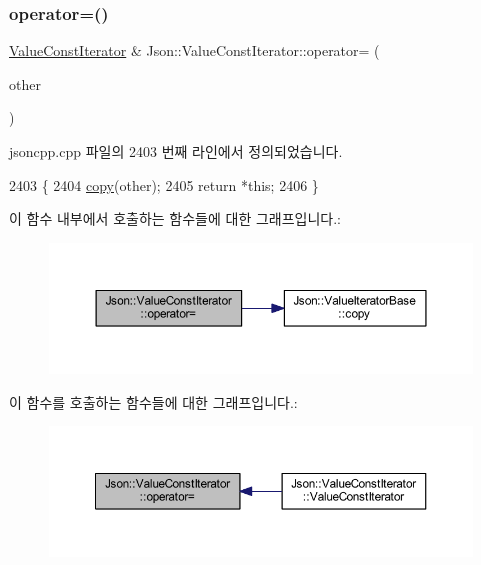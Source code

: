 \subsubsection{\texorpdfstring{operator=()}{operator=()}}
{\footnotesize\ttfamily \hyperlink{class_json_1_1_value_const_iterator}{Value\+Const\+Iterator} \& Json\+::\+Value\+Const\+Iterator\+::operator= (\begin{DoxyParamCaption}\item[{const \hyperlink{class_json_1_1_value_iterator_base}{Value\+Iterator\+Base} \&}]{other }\end{DoxyParamCaption})}



jsoncpp.\+cpp 파일의 2403 번째 라인에서 정의되었습니다.


\begin{DoxyCode}
2403                                           \{
2404   \hyperlink{class_json_1_1_value_iterator_base_a496e6aba44808433ec5858c178be5719}{copy}(other);
2405   \textcolor{keywordflow}{return} *\textcolor{keyword}{this};
2406 \}
\end{DoxyCode}
이 함수 내부에서 호출하는 함수들에 대한 그래프입니다.\+:\nopagebreak
\begin{figure}[H]
\begin{center}
\leavevmode
\includegraphics[width=350pt]{class_json_1_1_value_const_iterator_ad1b1c11f8d7fb22d4d3c231915f2b15b_cgraph}
\end{center}
\end{figure}
이 함수를 호출하는 함수들에 대한 그래프입니다.\+:\nopagebreak
\begin{figure}[H]
\begin{center}
\leavevmode
\includegraphics[width=350pt]{class_json_1_1_value_const_iterator_ad1b1c11f8d7fb22d4d3c231915f2b15b_icgraph}
\end{center}
\end{figure}
\mbox{\label{class_json_1_1_value_iterator_base_a1248d8016f88b51371a0fcbd355b3cfd}} 
